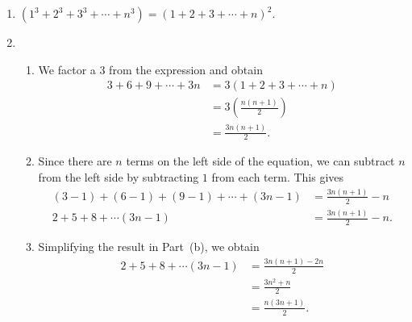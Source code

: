 \begin{enumerate}
\item $\left( {1^3  + 2^3  + 3^3  +  \cdots  + n^3 } \right) = \left( {1 + 2 + 3 +  \cdots  + n} \right)^2$.


\item \begin{enumerate}
\item We factor a 3 from the expression and obtain
\begin{align*} 3 + 6 + 9 + \cdots + 3n &=3 \left( 1 + 2 + 3 +  \cdots  + n \right) \\
                                       &= 3 \left( \frac{{n\left( {n + 1} \right)}}{2} \right) \\
                                       &= \frac{{3n\left( {n + 1} \right)}}{2}.
\end{align*}

\item Since there are $n$ terms on the left side of the equation, we can subtract $n$ from the left side by subtracting $1$ from each term.  This gives
\begin{align*}
(3 - 1) + (6 - 1) + (9 - 1) + \cdots + (3n - 1) &= \frac{{3n( {n + 1} )}}{2} - n \\
2 + 5 + 8 + \cdots (3n - 1) &= \frac{{3n( {n + 1} )}}{2} - n.
\end{align*}

\item Simplifying the result in Part~(b), we obtain
\begin{align*}
2 + 5 + 8 + \cdots (3n - 1) &= \frac{{3n( {n + 1} ) - 2n}}{2} \\
                            &= \frac{3n^2 + n}{2} \\
                            &= \frac{n(3n + 1)}{2}.
\end{align*}

\end{enumerate}



\end{enumerate}
